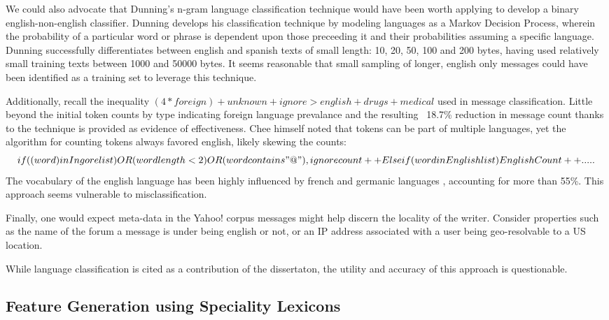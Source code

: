 \documentclass[twoside,11pt]{article}
\begin{document}
We could also advocate that Dunning's n-gram language classification technique would have been worth applying to develop a binary english-non-english classifier. Dunning develops his classification technique by modeling languages as a Markov Decision Process, wherein the probability of a particular word or phrase is dependent upon those preceeding it and their probabilities assuming a specific language. Dunning successfully differentiates between english and spanish texts of small length: 10, 20, 50, 100 and 200 bytes, having used relatively small training texts between 1000 and 50000 bytes. It seems reasonable that small sampling of longer, english only messages could have been identified as a training set to leverage this technique.

Additionally, recall the inequality $(4 * foreign) + unknown + ignore > english + drugs + medical$ used in message classification. Little beyond the initial token counts by type indicating foreign language prevalance and the resulting ~18.7\% reduction in message count thanks to the technique is provided as evidence of effectiveness. Chee himself noted that tokens can be part of multiple languages, yet the algorithm for counting tokens always favored english, likely skewing the counts:
\[
if ((word) in Ingore list) OR (word length < 2) OR (word contains "@"), ignore count ++
Else if (word in English list)
English Count++
.....
\]
The vocabulary of the english language has been highly influenced by french and germanic languages \citep{Wikipedia page for english}, accounting for more than 55\%. This approach seems vulnerable to misclassification.

Finally, one would expect meta-data in the Yahoo! corpus messages might help discern the locality of the writer. Consider properties such as the name of the forum a message is under being english or not, or an IP address associated with a user being geo-resolvable to a US location.

While language classification is cited as a contribution of the dissertaton, the utility and accuracy of this approach is questionable.

\subsection{Feature Generation using Speciality Lexicons}
\end{document}
